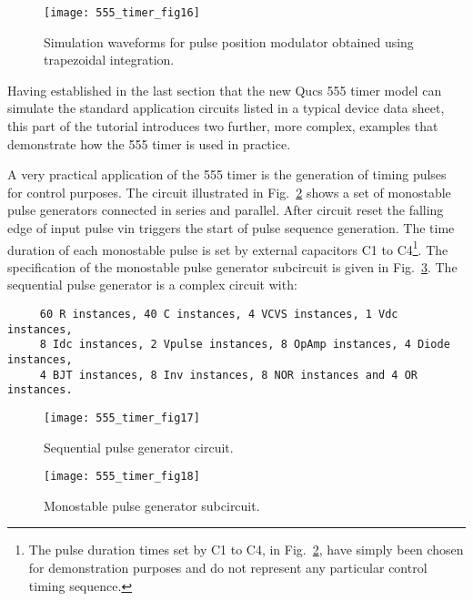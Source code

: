 \FloatBarrier
\begin{figure}[ht]
  \centering
  \texttt{[image: 555\_timer\_fig16]}
  \caption{Simulation waveforms for pulse position modulator obtained using trapezoidal integration.}
  \label{fig:555_timer_fig16} 
\end{figure} 
\FloatBarrier


\addvspace{12pt}

Having established in the last section that the new Qucs 555 timer model can simulate the standard application circuits listed in a typical device data sheet, this part of the tutorial introduces two further, more complex, examples that demonstrate how the 555 timer is used in practice.

A very practical application of the 555 timer is the generation of timing pulses for control purposes. The circuit illustrated in Fig.~\ref{fig:555_timer_fig17} shows a set of monostable pulse generators connected in series and parallel. After circuit reset the falling edge of input pulse vin triggers the start of pulse sequence generation. The time duration of each monostable pulse is set by external capacitors C1 to C4\footnote{The pulse duration times set by C1 to C4, in Fig.~\ref{fig:555_timer_fig17}, have simply been chosen for demonstration purposes and do not represent any particular control timing sequence.}. The specification of the monostable pulse generator subcircuit is given in Fig.~\ref{fig:555_timer_fig18}. The sequential pulse generator is a complex circuit with:

    \begin{verbatim}
     60 R instances, 40 C instances, 4 VCVS instances, 1 Vdc instances,
     8 Idc instances, 2 Vpulse instances, 8 OpAmp instances, 4 Diode instances, 
     4 BJT instances, 8 Inv instances, 8 NOR instances and 4 OR instances. 
\end{verbatim} 

\FloatBarrier
\begin{figure}[ht]
  \centering
  \texttt{[image: 555\_timer\_fig17]}
  \caption{Sequential pulse generator circuit.}
  \label{fig:555_timer_fig17} 
\end{figure} 
\FloatBarrier

\FloatBarrier
\begin{figure}[ht]
  \centering
  \texttt{[image: 555\_timer\_fig18]}
  \caption{Monostable pulse generator subcircuit.}
  \label{fig:555_timer_fig18} 
\end{figure} 
\FloatBarrier

